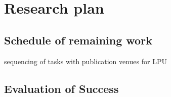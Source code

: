 \section{Research plan}
\label{sec:plan}

\subsection{Schedule of remaining work}

sequencing of tasks with publication venues for LPU

\subsection{Evaluation of Success}


